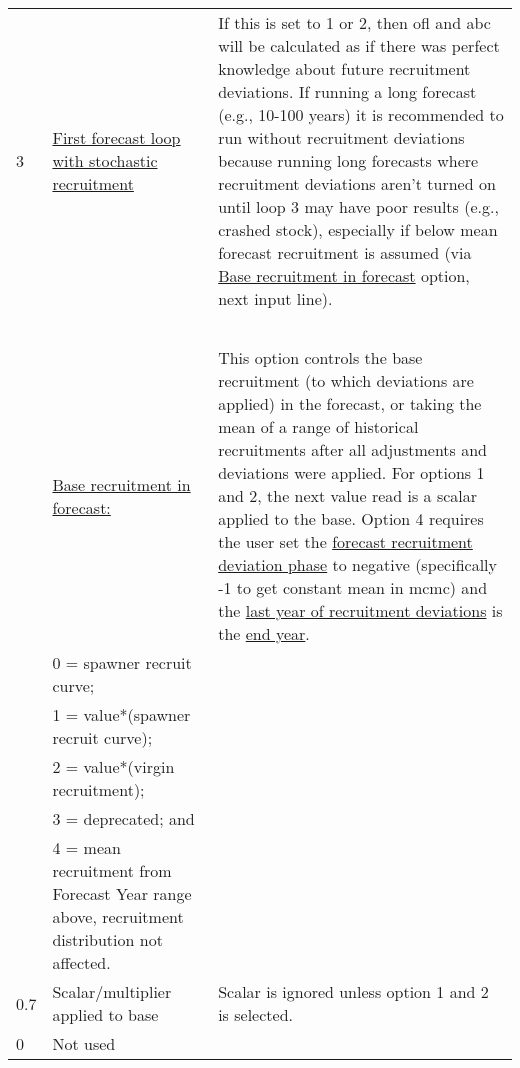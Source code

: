 \begin{landscape}
{\begin{longtable}{p{2cm} p{7cm} p{12cm}}
  \hline
  3 \Tstrut & \hyperlink{appendB}{First forecast loop with stochastic recruitment} & \multirow{1}{1cm}[-0.25cm]{\parbox{12cm}{If this is set to 1 or 2, then \gls{ofl} and \gls{abc} will be calculated as if there was perfect knowledge about future recruitment deviations. If running a long forecast (e.g., 10-100 years) it is recommended to run without recruitment deviations because running long forecasts where recruitment deviations aren't turned on until loop 3 may have poor results (e.g., crashed stock), especially if below mean forecast recruitment is assumed (via \hyperlink{FcastRecruitment}{Base recruitment in forecast} option, next input line).}} \Bstrut\\
    & & \\
    & & \\
    & & \\
    & & \\
    & & \\

  \pagebreak
  1 \Tstrut & \hyperlink{ForeSpawn}{Base recruitment in forecast:} \hypertarget{FcastRecruitment}{} & \multirow{1}{1cm}[-0.25cm]{\parbox{12cm}{This option controls the base recruitment (to which deviations are applied) in the forecast, or taking the mean of a range of historical recruitments after all adjustments and deviations were applied. For options 1 and 2, the next value read is a scalar applied to the base. Option 4 requires the user set the \hyperlink{FcastRecDevPhase}{forecast recruitment deviation phase} to negative (specifically -1 to get constant mean in \gls{mcmc}) and the \hyperlink{RecDevEndYear}{last year of recruitment deviations} is the \hyperlink{EndYear}{end year}.}} \\
    & 0 = spawner recruit curve; & \\
    & 1 = value*(spawner recruit curve); & \\
    & 2 = value*(virgin recruitment); & \\
    & 3 = deprecated; and & \\
    & 4 = mean recruitment from Forecast Year range above, recruitment distribution not affected. & \Bstrut\\

  \hline
  0.7 \Tstrut & Scalar/multiplier applied to base & \multirow{1}{1cm}[-0.05cm]{\parbox{12cm}{Scalar is ignored unless option 1 and 2 is selected.}} \Bstrut\\

  \hline
  0 & Not used & \Tstrut\Bstrut\\
  

\end{longtable}}
\end{landscape}
